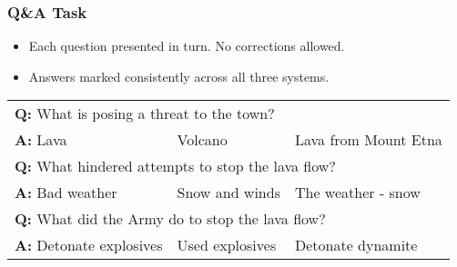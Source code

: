 \documentclass{beamer}
\begin{document}
\appendix


\begin{frame}
  \frametitle{Q\&A Task}
  \begin{itemize}
  \item Each question presented in turn.  No corrections allowed.
  \item Answers marked consistently across all three systems.
  \end{itemize}
  
    \begin{center}
      \begin{tabular}{lll}
        \multicolumn{3}{l}{\textbf{Q:} What is posing a threat to the town?} \\
        \textbf{A:} Lava & Volcano & Lava from Mount Etna \vspace{1.0ex}\\
        \multicolumn{3}{l}{\textbf{Q:} What hindered attempts to stop the lava flow?} \\
        \textbf{A:} Bad weather & Snow and winds & The weather - snow \vspace{1.0ex}\\
        \multicolumn{3}{l}{\textbf{Q:} What did the Army do to stop the lava flow?} \\
        \textbf{A:} Detonate explosives & Used explosives & Detonate dynamite   \\
      \end{tabular}
    \end{center}
\end{frame}
\end{document}
